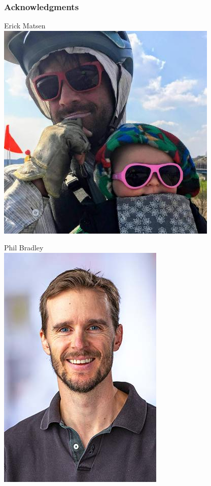 \documentclass[mathserif,compress,xcolor={dvipsnames}]{beamer}
\renewcommand\;{\,}
\begin{document}
\begin{frame}\frametitle{Acknowledgments}
\begin{minipage}{0.49\linewidth}
\begin{center}
Erick Matsen
\\
\includegraphics[width=0.8\linewidth]{Images/Erick.jpeg}
\end{center}
\end{minipage}
\begin{minipage}{0.49\linewidth}
\begin{center}
Phil Bradley
\\
\includegraphics[width=0.65\linewidth]{Images/Phil.jpg}
\end{center}
\end{minipage}
\end{frame}
\end{document}
